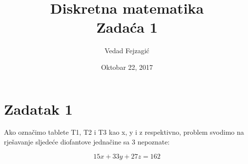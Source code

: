 \documentclass[12pt]{article}
\title{
  Diskretna matematika\\
  \large Zadaća 1 \\}
\author{Vedad Fejzagić}
\date{Oktobar 22, 2017}
\begin{document}
\maketitle

\iffalse

\section{Introduction}
\subsection{Who am I}

Hello world!
\textbf{This is bold text}
\textit{This is italic.}


\emph{this is emphatic.}
\underline{Some underline.}

``Propper quotes''

\section{List}
\begin{enumerate}
\item Bread
\item butter
\end{enumerate}

\section{Unordered List}
\begin{itemize}
\item Bread
	\begin{itemize}
	\item Bread
	\end{itemize}
\item butter
\end{itemize}
Ovo je \ref{Z1}
\fi

\newpage

\section*{Zadatak 1\label{Z1}}

\hspace{0.65cm}Ako označimo tablete T1, T2 i T3 kao x, y i z respektivno, problem svodimo na rješavanje sljedeće diofantove jednačine sa 3 nepoznate:

$$15x + 33y + 27z = 162$$\\
\end{document}
